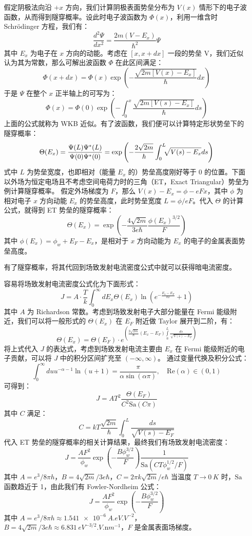 	假定阴极法向沿 $+x$ 方向，我们计算阴极表面势垒分布为 $V(x)$ 情形下的电子波函数，从而得到隧穿概率。设此时电子波函数为 $\Phi(x)$，利用一维含时 Schr\"odinger 方程，我们有：
	\[\frac{d^2\Psi}{dx^2}=\frac{2m(V-E_x)}{\hbar^2}\Psi\]
	其中 $E_x$ 为电子在 $x$ 方向的动能。考虑在 $[x, x+dx]$ 一段的势垒 V，我们近似认为其为常数，那么可解出波函数 $\Phi$ 在此区间满足：
	\[\Phi(x+dx)=\Phi(x)\exp\left(-\frac{\sqrt{2m[V(x)-E_x]}}{\hbar}dx\right)\]
	于是 $\Psi$ 在整个 $x$ 正半轴上的可写为：
	\[\Phi(x)=\Phi(0)\exp\left(-\int_0^x\frac{\sqrt{2m[V(s)-E_x]}}{\hbar}ds\right)\]
	上面的公式就称为 WKB 近似。有了波函数，我们便可以计算特定形状势垒下的隧穿概率：
	\[\Theta(E_x)=\frac{\Psi(L)\Psi^*(L)}{\Psi(0)\Psi^*(0)}=\exp\left(-\frac{2\sqrt{2m}}{\hbar}\int_0^L\!\!\!\sqrt{V(s)-E_x}ds\right)\]
	式中 $L$ 为势垒宽度，也即相对（能量 $E_x$ 的）势垒高度刚好等于 0 的位置。下面以外场为恒定电场且不考虑空间电荷力时的三角（ET，Exact Triangular）势垒为例计算隧穿概率。
	假定外场梯度为 $F$，那么 $V(x)-E_x=\phi-eFx$，其中 $\phi$ 为相对电子 $x$ 方向动能 $E_x$ 的势垒高度，此时势垒宽度 $L=\phi/eF$。代入 $\Theta$ 的计算公式，就得到 ET 势垒的隧穿概率：
	\begin{equation}
	\Theta(E_x)=\exp\left(-\frac{4\sqrt{2m}}{3e\hbar}\frac{\phi(E_x)^{3/2}}{F}\right)
	\end{equation}
	其中 $\phi(E_x)=\phi_w+E_F-E_x$，是相对于 $x$ 方向动能为 $E_x$ 的电子的金属表面势垒高度。
	
	有了隧穿概率，将其代回到场致发射电流密度公式中就可以获得暗电流密度。

	容易将场致发射电流密度公式化为下面形式：
	\[J = A\cdot\frac{T}{k}\int_0^{\infty} dE_x\Theta(E_x)\ln\left(e^{-\frac{E_x-E_F}{kT}}+1\right)\]
	其中 $A$ 为 Richardson 常数。考虑到场致发射电子大部分能量在 Fermi 能级附近，我们可以将一般形式的 $\Theta(E_x)$ 在 $E_F$ 附近做 Taylor 展开到二阶，有：
	\[\Theta(E_x)=\Theta(E_F)\cdot e^{\left(\frac{2\sqrt{2m}}{\hbar}(E_x-E_F)\int\limits_0^L\frac{ds}{\sqrt{V(s)-E_F}}\right)}\]
	将上式代入 $J$ 的表达式，考虑到场致发射电流主要由 $E_x$ 在 Fermi 能级附近的电子贡献，可以将 $J$ 中的积分区间扩充至 $(-\infty, \infty)$。
	通过变量代换及积分公式：
	\[\int_0^{\infty}du u^{-\alpha-1}\ln(u+1)=\frac{\pi}{\alpha\sin(\alpha\pi)},\quad\mathrm{Re}(\alpha)\in(0, 1)\]
	可得到：
	\[J = AT^2\frac{\Theta(E_F)}{C^2\mathrm{Sa}(C\pi)}\]
	其中 $C$ 满足：
	\[C = kT\frac{\sqrt{2m}}{\hbar}\int_0^L\frac{ds}{\sqrt{V(s)-E_F}}\]
	代入 ET 势垒的隧穿概率的相关计算结果，最终我们有场致发射电流密度：
	\begin{equation}
	J=\frac{AF^2}{\phi_w}\exp\left(-\frac{B\phi_w^{3/2}}{F}\right)\frac{1}{\mathrm{Sa}(CT\phi_w^{1/2}/F)}
	\end{equation}
	其中 $A=e^3/8\pi h$，$B=4\sqrt{2m}/3e\hbar$，$C=2\pi k\sqrt{2m}/e\hbar$
	当温度 $T\rightarrow \SI{0}{K}$ 时，$\mathrm{Sa}$ 函数趋近于 1，由此我们有 Fowler-Nordheim 公式：
	\begin{equation}
	J=\frac{AF^2}{\phi_w}\exp\left(-\frac{B\phi_w^{3/2}}{F}\right)
	\end{equation}
	其中 $A=e^3/8\pi h\approx\SI{1.541e-6}{A.eV.V^{-2}}$，$B=4\sqrt{2m}/3e\hbar\approx\SI{6.831}{eV^{-3/2}.V.\nano m^{-1}}$，$F$ 是金属表面场梯度。

